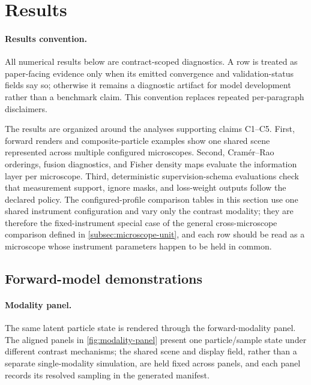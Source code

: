 \section{Results}
\label{sec:results}

\paragraph{Results convention.}
All numerical results below are contract-scoped diagnostics. A row is treated as paper-facing evidence only when its emitted convergence and validation-status fields say so; otherwise it remains a diagnostic artifact for model development rather than a benchmark claim. This convention replaces repeated per-paragraph disclaimers.


The results are organized around the analyses supporting claims C1--C5. First, forward renders and composite-particle examples show one shared scene represented across multiple configured microscopes. Second, Cram\'{e}r--Rao orderings, fusion diagnostics, and Fisher density maps evaluate the information layer per microscope. Third, deterministic supervision-schema evaluations check that measurement support, ignore masks, and loss-weight outputs follow the declared policy. The configured-profile comparison tables in this section use one shared instrument configuration and vary only the contrast modality; they are therefore the fixed-instrument special case of the general cross-microscope comparison defined in \cref{subsec:microscope-unit}, and each row should be read as a microscope whose instrument parameters happen to be held in common.

\subsection{Forward-model demonstrations}

\paragraph{Modality panel.} The same latent particle state is rendered through the forward-modality panel. The aligned panels in \cref{fig:modality-panel} present one particle/sample state under different contrast mechanisms; the shared scene and display field, rather than a separate single-modality simulation, are held fixed across panels, and each panel records its resolved sampling in the generated manifest.


